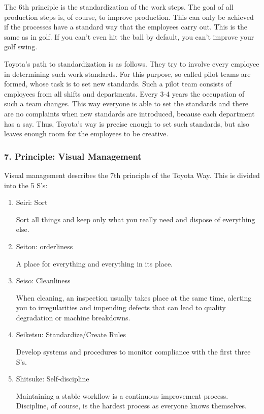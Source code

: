 \documentclass[a4paper,11pt]{article}
\begin{document}
The 6th principle is the standardization of the work steps. The goal of all
production steps is, of course, to improve production. This can only be
achieved if the processes have a standard way that the employees carry out.
This is the same as in golf. If you can't even hit the ball by default, you
can't improve your golf swing.

Toyota's path to standardization is as follows. They try to involve every
employee in determining such work standards. For this purpose, so-called pilot
teams are formed, whose task is to set new standards. Such a pilot team
consists of employees from all shifts and departments. Every 3-4 years the
occupation of such a team changes. This way everyone is able to set the
standards and there are no complaints when new standards are introduced,
because each department has a say. Thus, Toyota's way is precise enough to set
such standards, but also leaves enough room for the employees to be creative.

\subsubsection*{7. Principle: Visual Management}

Visual management describes the 7th principle of the Toyota Way. This is
divided into the 5 S's:

\begin{enumerate}
\item Seiri: Sort

  Sort all things and keep only what you really need and dispose of everything
  else.
\item Seiton: orderliness

  A place for everything and everything in its place.
\item Seiso: Cleanliness

  When cleaning, an inspection usually takes place at the same time, alerting
  you to irregularities and impending defects that can lead to quality
  degradation or machine breakdowns.
\item Seiketsu: Standardize/Create Rules

  Develop systems and procedures to monitor compliance with the first three
  S's.
\item Shitsuke: Self-discipline

  Maintaining a stable workflow is a continuous improvement
  process. Discipline, of course, is the hardest process as everyone knows
  themselves.
\end{enumerate}
\end{document}
